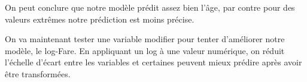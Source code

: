 \documentclass[11pt,french]{report}
\begin{document}
\bigskip
On peut conclure que notre modèle prédit assez bien l'âge, par contre pour des valeurs extrêmes notre prédiction est moins précise. \newline

On va maintenant tester une variable modifier pour tenter d'améliorer notre modèle, le log-Fare. En appliquant un log à une valeur numérique, on réduit l'échelle d'écart entre les variables et certaines peuvent mieux prédire après avoir être transformées.
\end{document}
